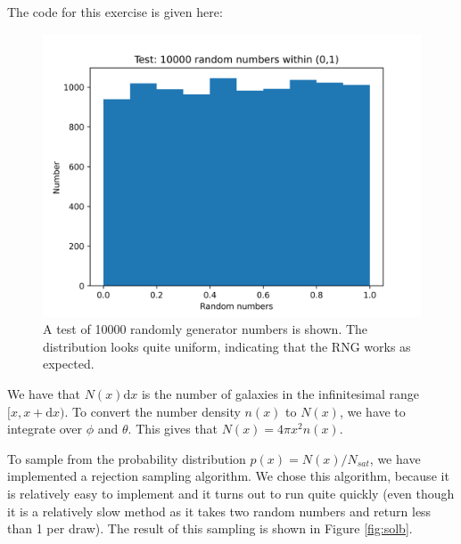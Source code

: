 The code for this exercise is given here:


\begin{figure}[h!]
    \centering
    \includegraphics[width=0.9\linewidth]{./hist.png}
    \caption{A test of 10000 randomly generator numbers is shown. The distribution looks quite uniform, indicating that the RNG works as expected.}
    \label{fig:hist}
\end{figure}

We have that $N(x)\text{d}x$ is the number of galaxies in the infinitesimal range $[x,x+\text{d}x)$. To convert the number density $n(x)$
to $N(x)$, we have to integrate over $\phi$ and $\theta$. This gives that $N(x)=4\pi x^2n(x)$.

To sample from the probability distribution $p(x)=N(x)/N_{sat}$, we have implemented a rejection sampling algorithm.
We chose this algorithm, because it is relatively easy to implement and it turns out to run quite quickly
(even though it is a relatively slow method as it takes two random numbers and return less than 1 per draw).
The result of this sampling is shown in Figure \ref{fig:solb}.

